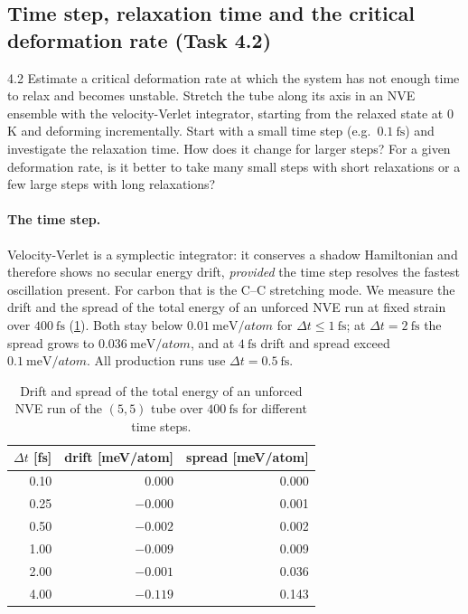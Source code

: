 \documentclass[11pt,a4paper]{article}
\numberwithin{equation}{section}
\theoremstyle{remark}
\begin{document}
\subsection{Time step, relaxation time and the critical deformation rate (Task 4.2)}\label{sec:rate}

\begin{task}{4.2}
  Estimate a critical deformation rate at which the system has not enough time to relax and becomes
  unstable. Stretch the tube along its axis in an NVE ensemble with the velocity-Verlet integrator,
  starting from the relaxed state at 0\,K and deforming incrementally. Start with a small time step
  (e.g.\ $\SI{0.1}{\femto\second}$) and investigate the relaxation time. How does it change for larger
  steps? For a given deformation rate, is it better to take many small steps with short relaxations or
  a few large steps with long relaxations?
\end{task}

\paragraph{The time step.}
Velocity-Verlet is a symplectic integrator: it conserves a shadow Hamiltonian and therefore shows no
secular energy drift, \emph{provided} the time step resolves the fastest oscillation present. For
carbon that is the C--C stretching mode. We measure the drift and the spread of the total energy of an
unforced NVE run at fixed strain over $\SI{400}{\femto\second}$ (\cref{tab:timestep}). Both stay below
$\SI{0.01}{\milli\electronvolt\per atom}$ for $\Delta t \le \SI{1}{\femto\second}$; at
$\Delta t = \SI{2}{\femto\second}$ the spread grows to $\SI{0.036}{\milli\electronvolt\per atom}$, and at
$\SI{4}{\femto\second}$ drift and spread exceed $\SI{0.1}{\milli\electronvolt\per atom}$. All production
runs use $\Delta t = \SI{0.5}{\femto\second}$.

\begin{table}[ht]
  \centering
  \caption{Drift and spread of the total energy of an unforced NVE run of the $(5,5)$ tube over
    $\SI{400}{\femto\second}$ for different time steps.}
  \label{tab:timestep}
  \begin{tabular}{rrr}
    \toprule
    $\Delta t$ [fs] & drift [meV/atom] & spread [meV/atom] \\
    \midrule
    0.10 &  0.000 & 0.000 \\
    0.25 & $-0.000$ & 0.001 \\
    0.50 & $-0.002$ & 0.002 \\
    1.00 & $-0.009$ & 0.009 \\
    2.00 & $-0.001$ & 0.036 \\
    4.00 & $-0.119$ & 0.143 \\
    \bottomrule
  \end{tabular}
\end{table}
\end{document}
